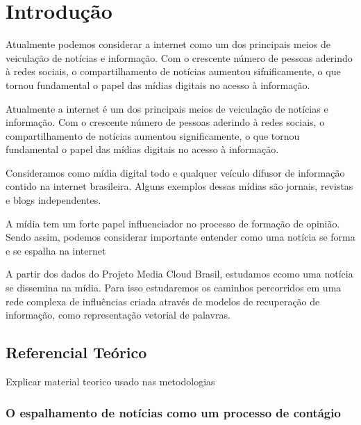 \documentclass[a4paper,12pt]{article}
\begin{document}
\pagebreak

\section{Introdução}

Atualmente podemos considerar a internet como um dos principais meios de veiculação de notícias e informação. Com o crescente
número de pessoas aderindo à redes sociais, o compartilhamento de notícias aumentou sifnificamente, o que tornou fundamental
o papel das mídias digitais no acesso à informação.

Atualmente a internet é um dos principais meios de veiculação de notícias e informação. Com o crescente
número de pessoas aderindo à redes sociais, o compartilhamento de notícias aumentou significamente, o que tornou fundamental
o papel das mídias digitais no acesso à informação.

Consideramos como mídia digital todo e qualquer veículo difusor de informação contido na internet brasileira. Alguns exemplos dessas mídias
são jornais, revistas e blogs independentes.



A mídia tem um forte papel influenciador no processo de formação de opinião. Sendo assim, podemos considerar 
importante entender como uma notícia se forma e se espalha na internet

A partir dos dados do Projeto Media Cloud Brasil, estudamos ccomo uma notícia se dissemina na mídia. Para isso
estudaremos os caminhos percorridos em uma rede complexa de influências criada através de modelos de recuperação de informação, 
como representação vetorial de palavras.

\subsection{Referencial Teórico}

Explicar material teorico usado nas metodologias
\subsubsection{O espalhamento de notícias como um processo de contágio}
\end{document}
